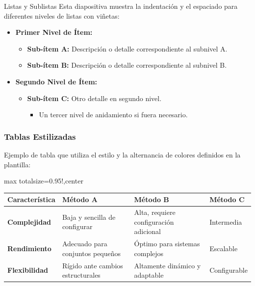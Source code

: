 \documentclass[aspectratio=169, 10pt]{beamer}
\begin{document}
\begin{frame}[s]{Listas y Sublistas}
   Esta diapositiva muestra la indentación y el espaciado para diferentes niveles de listas con viñetas:
   
   \begin{itemize}
      \item \textbf{Primer Nivel de Ítem:}
         \begin{itemize}
            \item \textbf{Sub-ítem A:} Descripción o detalle correspondiente al subnivel A.
            \item \textbf{Sub-ítem B:} Descripción o detalle correspondiente al subnivel B.
         \end{itemize}
      \item \textbf{Segundo Nivel de Ítem:}
         \begin{itemize}
            \item \textbf{Sub-ítem C:} Otro detalle en segundo nivel.
               \begin{itemize}
                  \item Un tercer nivel de anidamiento si fuera necesario.
               \end{itemize}
         \end{itemize}
   \end{itemize}
\end{frame}

\begin{frame}
   \frametitle{Tablas Estilizadas}
   Ejemplo de tabla que utiliza el estilo y la alternancia de colores definidos en la plantilla:
   \vskip 0.5cm
      \begin{adjustbox}{max totalsize={0.95\textwidth}{!},center}
       \begin{tabular}{p{2.5cm}|p{3.5cm}|p{3.5cm}|p{3.5cm}}
          \textbf{Característica} & \textbf{Método A} & \textbf{Método B} & \textbf{Método C} \\
          \hline
          \textbf{Complejidad} & Baja y sencilla de configurar & Alta, requiere configuración adicional & Intermedia \\
          \hline
          \textbf{Rendimiento} & Adecuado para conjuntos pequeños & Óptimo para sistemas complejos & Escalable \\
          \hline
          \textbf{Flexibilidad} & Rígido ante cambios estructurales & Altamente dinámico y adaptable & Configurable \\
          \hline
       \end{tabular}
    \end{adjustbox}
\end{frame}
\end{document}
